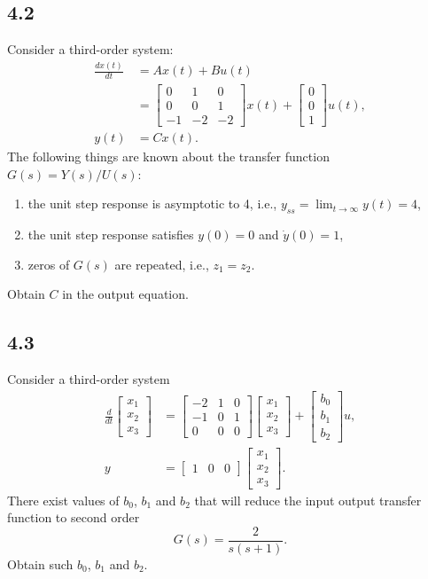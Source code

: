 \documentclass{article}
\newcommand{\problem}[2]{\subsection*{#1}}
\begin{document}
\problem{4.2}{}
Consider a third-order system:
\[
\begin{aligned}
\frac{dx(t)}{dt} &= Ax(t) + Bu(t) \\
&= \begin{bmatrix} 0 & 1 & 0 \\ 0 & 0 & 1 \\ -1 & -2 & -2 \end{bmatrix} x(t) + \begin{bmatrix} 0 \\ 0 \\ 1 \end{bmatrix} u(t), \\
y(t) &= Cx(t).
\end{aligned}
\]
The following things are known about the transfer function $G(s) = Y(s)/U(s)$:
\begin{enumerate}
\item the unit step response is asymptotic to 4, i.e., $y_{ss} = \lim_{t \to \infty} y(t) = 4$,
\item the unit step response satisfies $y(0) = 0$ and $\dot{y}(0) = 1$,
\item zeros of $G(s)$ are repeated, i.e., $z_1 = z_2$.
\end{enumerate}
Obtain $C$ in the output equation.

\problem{4.3}{}
Consider a third-order system
\[
\begin{aligned}
\frac{d}{dt}\begin{bmatrix} x_1 \\ x_2 \\ x_3 \end{bmatrix} &=
\begin{bmatrix} -2 & 1 & 0 \\ -1 & 0 & 1 \\ 0 & 0 & 0 \end{bmatrix}
\begin{bmatrix} x_1 \\ x_2 \\ x_3 \end{bmatrix} +
\begin{bmatrix} b_0 \\ b_1 \\ b_2 \end{bmatrix} u, \\
y &= \begin{bmatrix} 1 & 0 & 0 \end{bmatrix} \begin{bmatrix} x_1 \\ x_2 \\ x_3 \end{bmatrix}.
\end{aligned}
\]
There exist values of $b_0$, $b_1$ and $b_2$ that will reduce the input output transfer function to second order
\[
G(s) = \frac{2}{s(s + 1)}.
\]
Obtain such $b_0$, $b_1$ and $b_2$.
\end{document}
